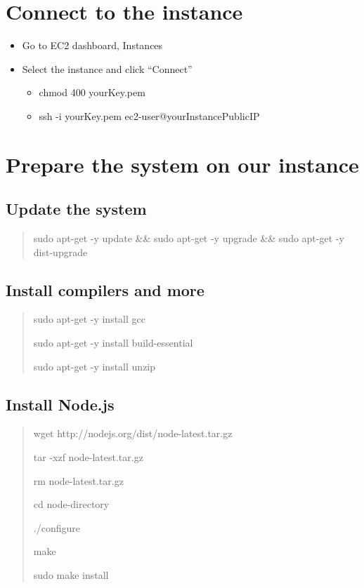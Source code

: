 \documentclass[a4paper]{report}
\begin{document}
  \section{Connect to the instance}
    \begin{itemize}
      \item Go to EC2 dashboard, Instances
      \item Select the instance and click ``Connect''
        \begin{itemize}
          \item chmod 400 yourKey.pem
          \item ssh -i yourKey.pem ec2-user@yourInstancePublicIP
        \end{itemize}
    \end{itemize}

  \section{Prepare the system on our instance}
    \subsection{Update the system}
      \begin{quotation}
        sudo apt-get -y update \&\& sudo apt-get -y upgrade \&\& sudo apt-get -y dist-upgrade
      \end{quotation}

    \subsection{Install compilers and more}
      \begin{quotation}
        sudo apt-get -y install gcc %

        sudo apt-get -y install build-essential %

        sudo apt-get -y install unzip


      \end{quotation}

    \subsection{Install Node.js}
      \begin{quotation}
        wget http://nodejs.org/dist/node-latest.tar.gz

        tar -xzf node-latest.tar.gz

        rm node-latest.tar.gz

        cd node-directory

        ./configure

        make

        sudo make install
      \end{quotation}
\end{document}
